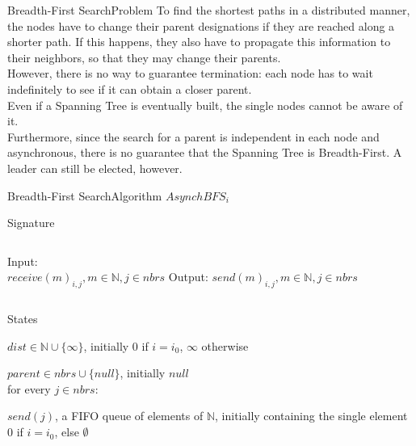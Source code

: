 \documentclass[pdf]{beamer}
\begin{document}
\begin{frame}{Breadth-First Search}{Problem}
    To find the shortest paths in a distributed manner, the nodes have to change their parent designations if they are reached along a shorter path. If this happens, they also have to propagate this information to their neighbors, so that they may change their parents. \\
    \vspace{12pt}
    \pause
    However, there is no way to guarantee termination: each node has to wait indefinitely to see if it can obtain a closer parent. \\
    \vspace{12pt}
    \pause
    Even if a Spanning Tree is eventually built, the single nodes cannot be aware of it. \\
    \vspace{12pt}
    \pause
    Furthermore, since the search for a parent is independent in each node and asynchronous, there is no guarantee that the Spanning Tree is Breadth-First. A leader can still be elected, however.
\end{frame}

\begin{frame}{Breadth-First Search}{Algorithm}
	$AsynchBFS_i$
    \begin{block}{Signature}
        \begin{columns}
            Input:\\
            \hspace*{\parindent} $receive(m)_{i,j}, m \in \mathbb{N}, j \in nbrs$
            Output:
            \hspace*{\parindent} $send(m)_{i,j}, m \in \mathbb{N}, j \in nbrs$
        \end{columns}
    \end{block}
    \begin{block}{States}
        \begin{tcolorbox}[height=0.8cm,colframe=red]
        $dist \in \mathbb{N} \cup \{\infty\}$, initially $0$ if $i=i_0$, $\infty $ otherwise\\
        \end{tcolorbox}
        $parent \in nbrs \cup \{null\}$, initially $null$\\
        for every $j \in nbrs$:\\
        \hspace*{\parindent}
        \parbox{\textwidth}{$send(j)$,
        a FIFO queue of elements of $\mathbb{N}$,
        initially containing the single element $0$ if $i=i_0$, else $\emptyset$}
    \end{block}
	
\end{frame}
\end{document}
